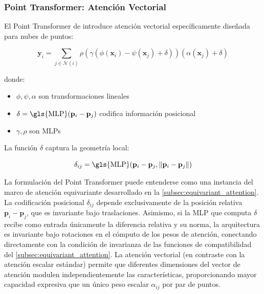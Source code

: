 \subsubsection{Point \gls{Transformer}: Atención Vectorial}

El Point \gls{Transformer} de \citet{zhao2021point} introduce atención vectorial específicamente diseñada para nubes de puntos:

\begin{equation}
    \mathbf{y}_i = \sum_{j \in \mathcal{N}(i)} \rho(\gamma(\phi(\mathbf{x}_i) - \psi(\mathbf{x}_j) + \delta))(\alpha(\mathbf{x}_j) + \delta)
    \label{eq:point_transformer_attention}
\end{equation}

donde:
\begin{itemize}
    \item $\phi, \psi, \alpha$ son transformaciones lineales
    \item $\delta = \text{\gls{MLP}}(\mathbf{p}_i - \mathbf{p}_j)$ codifica información posicional
    \item $\gamma, \rho$ son \glspl{MLP}
\end{itemize}

La función $\delta$ captura la geometría local:

\begin{equation}
    \delta_{ij} = \text{\gls{MLP}}(\mathbf{p}_i - \mathbf{p}_j, \|\mathbf{p}_i - \mathbf{p}_j\|)
    \label{eq:positional_encoding_3d}
\end{equation}

La formulación del Point \gls{Transformer} puede entenderse como una instancia del marco de atención equivariante desarrollado en la \autoref{subsec:equivariant_attention}. La codificación posicional $\delta_{ij}$ depende exclusivamente de la posición relativa $\mathbf{p}_i - \mathbf{p}_j$, que es invariante bajo traslaciones. Asimismo, si la \gls{MLP} que computa $\delta$ recibe como entrada únicamente la diferencia relativa y su norma, la arquitectura es invariante bajo rotaciones en el cómputo de los pesos de atención, conectando directamente con la condición de invarianza de las funciones de compatibilidad del \autoref{subsec:equivariant_attention}. La atención vectorial (en contraste con la atención escalar estándar) permite que diferentes dimensiones del vector de atención modulen independientemente las características, proporcionando mayor capacidad expresiva que un único peso escalar $\alpha_{ij}$ por par de puntos.

